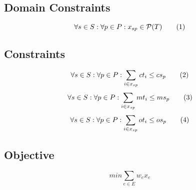 \subsection{Domain Constraints}
\[\forall s \in S : \forall p \in P : x_{sp} \in \mathcal{P}(T) \addtag \]

\subsection{Constraints}
\[\forall s \in S : \forall p \in P : \sum_{i \in x_{sp}} ct_{i} \leq cs_{p} \addtag \]
\[\forall s \in S : \forall p \in P : \sum_{i \in x_{sp}} mt_{i} \leq ms_{p} \addtag \]
\[\forall s \in S : \forall p \in P : \sum_{i \in x_{sp}} ot_{i} \leq os_{p} \addtag \]


\subsection{Objective}

\[ min \sum_{e \in E}w_ex_e \]